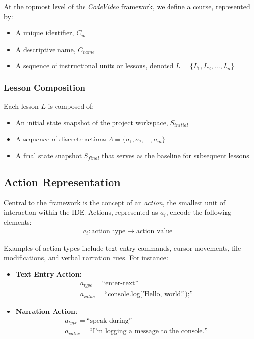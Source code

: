 \documentclass[11pt, a4paper]{article}
\begin{document}
At the topmost level of the \textit{CodeVideo} framework, we define a course, represented by:
\begin{itemize}
    \item A unique identifier, \( C_{id} \)
    \item A descriptive name, \( C_{name} \)
    \item A sequence of instructional units or lessons, denoted \( L = \{ L_1, L_2, \dots, L_n \} \)
\end{itemize}

\subsubsection{Lesson Composition}

Each lesson \( L \) is composed of:
\begin{itemize}
    \item An initial state snapshot of the project workspace, \( S_{initial} \)
    \item A sequence of discrete actions \( A = \{ a_1, a_2, \dots, a_m \} \)
    \item A final state snapshot \( S_{final} \) that serves as the baseline for subsequent lessons
\end{itemize}

\subsection{Action Representation}

Central to the framework is the concept of an \textit{action}, the smallest unit of interaction within the IDE. Actions, represented as \( a_i \), encode the following elements:
\begin{align*}
    a_i : \text{action\_type} \rightarrow \text{action\_value}
\end{align*}

Examples of action types include text entry commands, cursor movements, file modifications, and verbal narration cues. For instance:
\begin{itemize}
    \item \textbf{Text Entry Action:} 
    \begin{align*}
        & a_{type} = \text{``enter-text''} \\
        & a_{value} = \text{``console.log('Hello, world!');''}
    \end{align*}
    \item \textbf{Narration Action:} 
    \begin{align*}
        & a_{type} = \text{``speak-during''} \\
        & a_{value} = \text{``I'm logging a message to the console.''}
    \end{align*}
\end{itemize}
\end{document}
